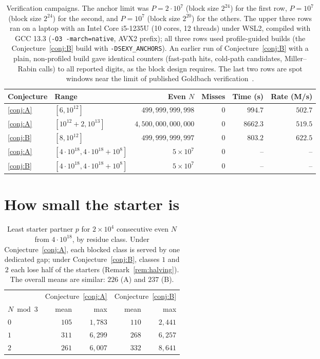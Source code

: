 \documentclass[11pt]{article}
\theoremstyle{definition}
\theoremstyle{remark}
\begin{document}
\begin{table}[ht]
\centering
\begin{tabular}{llrrrr}
\toprule
Conjecture & Range & Even $N$ & Misses & Time (s) & Rate (M/s)\\
\midrule
\ref{conj:A} & $[6,10^{12}]$ & $499{,}999{,}999{,}998$ & $0$ & $994.7$ & $502.7$\\
\ref{conj:A} & $[10^{12}+2,10^{13}]$ & $4{,}500{,}000{,}000{,}000$ & $0$ & $8662.3$ & $519.5$\\
\ref{conj:B} & $[8,10^{12}]$ & $499{,}999{,}999{,}997$ & $0$ & $803.2$ & $622.5$\\
\midrule
\ref{conj:A} & $[4\cdot10^{18},4\cdot10^{18}+10^8]$ & $5\times10^7$ & $0$ & -- & --\\
\ref{conj:B} & $[4\cdot10^{18},4\cdot10^{18}+10^8]$ & $5\times10^7$ & $0$ & -- & --\\
\bottomrule
\end{tabular}
\caption{Verification campaigns. The anchor limit was $P=2\cdot10^7$ (block size $2^{24}$) for the
first row, $P=10^7$ (block size $2^{24}$) for the second, and $P=10^7$ (block size $2^{20}$) for the
others. The upper three rows ran
on a laptop with an Intel Core i5-1235U (10 cores, 12 threads) under WSL2,
compiled with GCC 13.3 (\texttt{-O3 -march=native}, AVX2 prefix); all three
rows used profile-guided builds (the Conjecture~\ref{conj:B} build with
\texttt{-DSEXY\_ANCHORS}). An earlier run of Conjecture~\ref{conj:B} with a plain,
non-profiled build gave identical counters (fast-path hits, cold-path candidates,
Miller--Rabin calls) to all reported digits, as the block design requires.
The last two rows are spot windows near the limit of published Goldbach
verification~\cite{OHP}.}
\label{tab:runs}
\end{table}

\section{How small the starter is}\label{sec:fuel}

\begin{table}[ht]
\centering
\begin{tabular}{lrrrr}
\toprule
& \multicolumn{2}{c}{Conjecture~\ref{conj:A}} & \multicolumn{2}{c}{Conjecture~\ref{conj:B}}\\
\cmidrule(lr){2-3}\cmidrule(lr){4-5}
$N\bmod 3$ & mean & max & mean & max \\
\midrule
$0$ & $105$ & $1{,}783$ & $110$ & $2{,}441$\\
$1$ & $311$ & $6{,}299$ & $268$ & $6{,}257$\\
$2$ & $261$ & $6{,}007$ & $332$ & $8{,}641$\\
\bottomrule
\end{tabular}
\caption{Least starter partner $p$ for $2\times10^4$ consecutive even $N$ from
$4\cdot10^{18}$, by residue class. Under Conjecture~\ref{conj:A}, each blocked
class is served by one dedicated gap; under Conjecture~\ref{conj:B}, classes $1$
and $2$ each lose half of the starters (Remark~\ref{rem:halving}). The overall
means are similar: $226$ (A) and $237$ (B).}
\label{tab:fuel}
\end{table}
\end{document}
